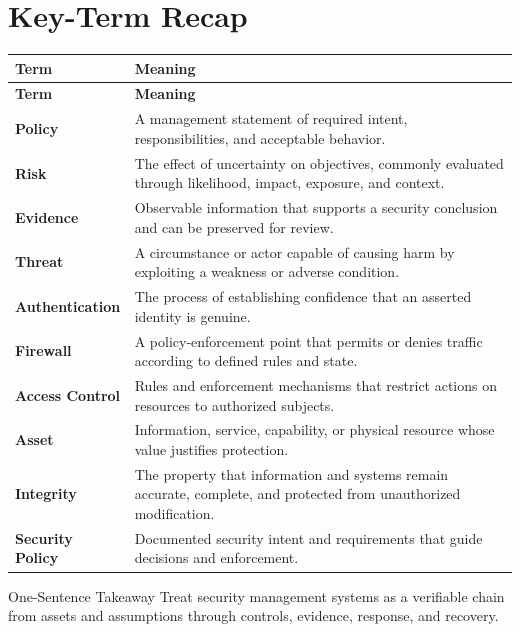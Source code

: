 \documentclass[11pt,letterpaper]{article}
\begin{document}
\section*{Key-Term Recap}
\begin{longtable}{>{\raggedright\arraybackslash}p{}>{\raggedright\arraybackslash}p{}}
\toprule\rowcolor{Navy}\color{white}\textbf{Term} & \color{white}\textbf{Meaning}\\\midrule
\endfirsthead
\toprule\rowcolor{Navy}\color{white}\textbf{Term} & \color{white}\textbf{Meaning}\\\midrule
\endhead
\textbf{Policy} & A management statement of required intent, responsibilities, and acceptable behavior. \\\midrule
\textbf{Risk} & The effect of uncertainty on objectives, commonly evaluated through likelihood, impact, exposure, and context. \\\midrule
\textbf{Evidence} & Observable information that supports a security conclusion and can be preserved for review. \\\midrule
\textbf{Threat} & A circumstance or actor capable of causing harm by exploiting a weakness or adverse condition. \\\midrule
\textbf{Authentication} & The process of establishing confidence that an asserted identity is genuine. \\\midrule
\textbf{Firewall} & A policy-enforcement point that permits or denies traffic according to defined rules and state. \\\midrule
\textbf{Access Control} & Rules and enforcement mechanisms that restrict actions on resources to authorized subjects. \\\midrule
\textbf{Asset} & Information, service, capability, or physical resource whose value justifies protection. \\\midrule
\textbf{Integrity} & The property that information and systems remain accurate, complete, and protected from unauthorized modification. \\\midrule
\textbf{Security Policy} & Documented security intent and requirements that guide decisions and enforcement. \\\midrule
\bottomrule
\end{longtable}
\begin{CornellExamBox}{One-Sentence Takeaway}
Treat security management systems as a verifiable chain from assets and assumptions through controls, evidence, response, and recovery.
\end{CornellExamBox}
\end{document}
